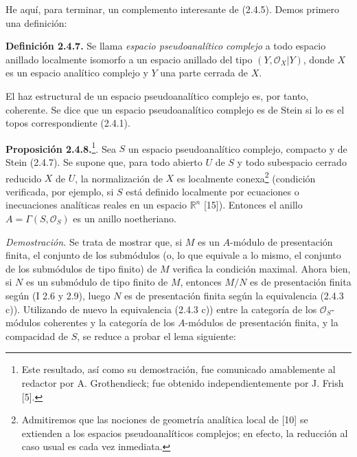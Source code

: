 \providecommand{\sisi}[2]{#2}

He aquí, para terminar, un complemento interesante de (2.4.5). Demos primero una definición:

\textbf{Definición 2.4.7.} Se llama \emph{espacio pseudoanalítico complejo} a todo espacio anillado localmente isomorfo a un espacio anillado del tipo $(Y,\mathcal O_X|Y)$, donde $X$ es un espacio analítico complejo y $Y$ una parte cerrada de $X$.

El haz estructural de un espacio pseudoanalítico complejo es, por tanto, coherente. Se dice que un espacio pseudoanalítico complejo es de Stein si lo es el topos correspondiente (2.4.1).



\providecommand{\Qcoh}{\operatorname{Qcoh}}
\providecommand{\Mod}{\operatorname{Mod}}
\providecommand{\Coh}{\operatorname{Coh}}
\providecommand{\Ob}{\operatorname{Ob}}
\providecommand{\Hom}{\operatorname{Hom}}
\providecommand{\Ext}{\operatorname{Ext}}
\providecommand{\Spec}{\operatorname{Spec}}
\providecommand{\qcoh}{\mathrm{qcoh}}
\providecommand{\parf}{\mathrm{parf}}
\providecommand{\coh}{\mathrm{coh}}
\providecommand{\Loclib}{\operatorname{Loclib}}
\providecommand{\Lib}{\operatorname{Lib}}
\providecommand{\im}{\operatorname{Im}}

\textbf{Proposición 2.4.8.}\footnote{Este resultado, así como su demostración, fue comunicado amablemente al redactor por A. Grothendieck; fue obtenido independientemente por J. Frish [5].}. Sea $S$ un espacio pseudoanalítico complejo, compacto y de Stein (2.4.7). Se supone que, para todo abierto $U$ de $S$ y todo subespacio cerrado reducido $X$ de $U$, la normalización de $X$ es localmente conexa\footnote{Admitiremos que las nociones de geometría analítica local de [10] se extienden a los espacios pseudoanalíticos complejos; en efecto, la reducción al caso usual es cada vez inmediata.} (condición verificada, por ejemplo, si $S$ está definido localmente por ecuaciones o inecuaciones analíticas reales en un espacio $\mathbb R^n$ [15]). Entonces el anillo $A=\Gamma(S,\mathcal O_S)$ es un anillo noetheriano.

\emph{Demostración.} Se trata de mostrar que, si $M$ es un $A$-módulo de presentación finita, el conjunto de los submódulos (o, lo que equivale a lo mismo, el conjunto de los submódulos de tipo finito) de $M$ verifica la condición maximal. Ahora bien, si $N$ es un submódulo de tipo finito de $M$, entonces $M/N$ es de presentación finita según (I 2.6 y 2.9), luego $N$ es de presentación finita según la equivalencia (2.4.3 c)). Utilizando de nuevo la equivalencia (2.4.3 c)) entre la categoría de los $\mathcal O_S$-módulos coherentes y la categoría de los $A$-módulos de presentación finita, y la compacidad de $S$, se reduce a probar el lema siguiente:

